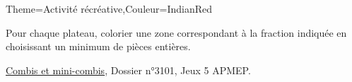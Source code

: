 \begin{Maquette}[Cours]{Theme={Activité récréative},Couleur={IndianRed}}
      \vfill

         Pour chaque plateau, colorier une zone correspondant à la fraction indiquée en choisissant un minimum de pièces entières. \par \medskip

         \vskip8mm


      \vfill\hfill{\footnotesize \href{https://www.apmep.fr/Librairie#/dossiers-jeux/1434-combis-et-mini-combis.html}{Combis et mini-combis}, Dossier n°3101, Jeux 5 APMEP.}
   \end{Maquette}
    
